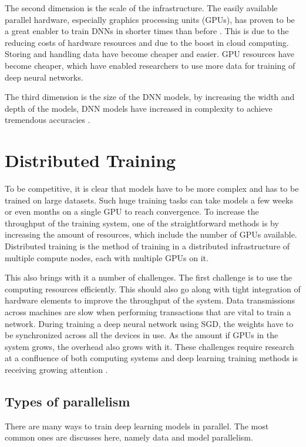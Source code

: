 The second dimension is the scale of the infrastructure. The easily available parallel hardware, especially graphics processing units (GPUs), has proven to be a great enabler to train DNNs in shorter times than before \cite{ZhangPoseidon:Clusters}. This is due to the reducing costs of hardware resources and due to the boost in cloud computing. Storing and handling data have become cheaper and easier. GPU resources have become cheaper, which have enabled researchers to use more data for training of deep neural networks. 

The third dimension is the size of the DNN models, by increasing the width and depth of the models, DNN models have increased in complexity to achieve tremendous accuracies \cite{DeanLargeNetworks}. 

\section{Distributed Training}
To be competitive, it is clear that models have to be more complex and has to be trained on large datasets. Such huge training tasks can take models a few weeks or even months on a single GPU to reach convergence. To increase the throughput of the training system, one of the straightforward  methods is by increasing the amount of resources, which include the number of GPUs available. Distributed training is the method of training in a distributed infrastructure of multiple compute nodes, each with multiple GPUs on it\cite{Langer2020DistributedPerspective}. 

This also brings with it a number of challenges. The first challenge is to use the computing resources efficiently. This should also go along with tight integration of hardware elements to improve the throughput of the system. Data transmissions across machines are slow when performing transactions that are vital to train a network. During training a deep neural network using SGD, the weights have to be synchronized across all the devices in use. As the amount if GPUs in the system grows, the overhead also grows with it. These challenges require research at a confluence of both computing systems and deep learning training methods is receiving growing attention \cite{Xiao2018Gandiva:Learning, Mai2020KungFu:Adaptive, Chilimbi2014ProjectSystem, CuiGeePS:Server, Peng2018Optimus:Clusters}.

\subsection{Types of parallelism}
There are many ways to train deep learning models in parallel. The most common ones are discusses here, namely data and model parallelism.

